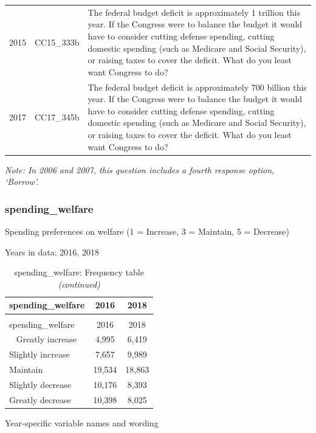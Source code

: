 \documentclass[12pt]{article}
\begin{document}
\begin{longtable}[t]{rl>{\raggedright\arraybackslash}p{10cm}}
2015 & CC15\_333b & The federal budget deficit is approximately 1 trillion this year. If the Congress were to balance the budget it would have to consider cutting defense spending, cutting domestic spending (such as Medicare and Social Security), or raising taxes to cover the deficit. What do you least want Congress to do?\\
2017 & CC17\_345b & The federal budget deficit is approximately 700 billion this year. If the Congress were to balance the budget it would have to consider cutting defense spending, cutting domestic spending (such as Medicare and Social Security), or raising taxes to cover the deficit. What do you least want Congress to do?\\*
\end{longtable}

\emph{Note: In 2006 and 2007, this question includes a fourth response
option, `Borrow'.}

\subsubsection{spending\_welfare}\label{spending_welfare}

Spending preferences on welfare (1 = Increase, 3 = Maintain, 5 =
Decrease)

Years in data: 2016, 2018

\begin{longtable}[t]{lcc}
\caption{\label{tab:unnamed-chunk-4}spending\_welfare: Frequency table}\\
\toprule
spending\_welfare & 2016 & 2018\\
\midrule
\endfirsthead
\caption[]{spending\_welfare: Frequency table \textit{(continued)}}\\
\toprule
spending\_welfare & 2016 & 2018\\
\midrule
\endhead
\
\endfoot
\bottomrule
\endlastfoot
Greatly increase & 4,995 & 6,419\\
Slightly increase & 7,657 & 9,989\\
Maintain & 19,534 & 18,863\\
Slightly decrease & 10,176 & 8,393\\
Greatly decrease & 10,398 & 8,025\\*
\end{longtable}

Year-specific variable names and wording
\end{document}
